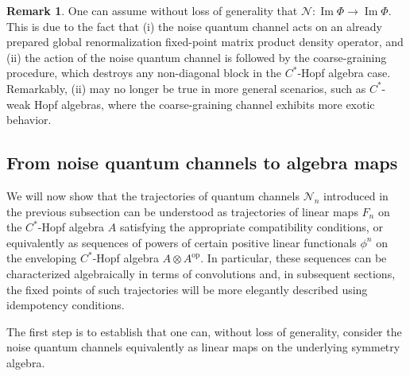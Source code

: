 \documentclass[a4paper,10pt]{amsart}
\newcommand{\Noisy}{\mathcal{N}}
\theoremstyle{definition}
\newtheorem{remark}[theorem]{Remark}
\begin{document}
\begin{remark}
One can assume without loss of generality that $\Noisy:\operatorname{Im}\Phi \to \operatorname{Im}\Phi$. This is due to the fact that (i) the noise quantum channel acts on an already prepared global renormalization fixed-point matrix product density operator, and (ii) the action of the noise quantum channel is followed by the coarse-graining procedure, which destroys any non-diagonal block in the $C^*$-Hopf algebra case. Remarkably, (ii) may no longer be true in more general scenarios, such as $C^*$-weak Hopf algebras, where the coarse-graining channel exhibits more exotic behavior.
\end{remark}

\subsection{From noise quantum channels to algebra maps}

We will now show that the trajectories of quantum channels $\Noisy_n$ introduced in the previous subsection can be understood as trajectories of linear maps $F_{n}$ on the $C^*$-Hopf algebra $A$ satisfying the appropriate compatibility conditions, or equivalently as sequences of powers of certain positive linear functionals $\phi^{n}$ on the enveloping $C^*$-Hopf algebra $A \otimes A^{\mathrm{op}}$. 
In particular, these sequences can be characterized algebraically in terms of convolutions and, in subsequent sections, the fixed points of such trajectories will be more elegantly described using idempotency conditions.

The first step is to establish that one can, without loss of generality, consider the noise quantum channels equivalently as linear maps on the underlying symmetry algebra.
\end{document}
